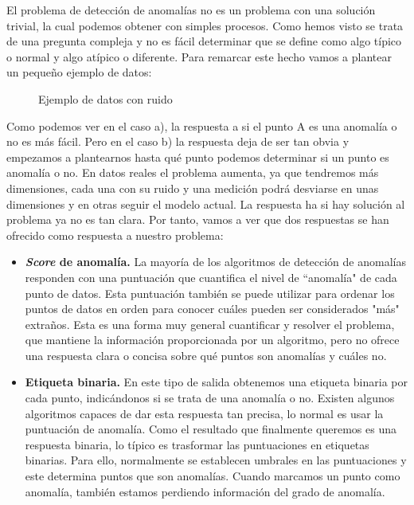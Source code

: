 El problema de detección de anomalías no es un problema con una solución trivial, la cual podemos obtener con simples procesos.
Como hemos visto se trata de una pregunta compleja y no es fácil determinar que se define como algo típico o normal y
algo atípico o diferente. Para remarcar este hecho vamos a plantear un pequeño ejemplo de datos:

\begin{figure}[h]
    \caption{\label{fig:my-label} Ejemplo de datos con ruido}
\end{figure}

Como podemos ver en el caso a), la respuesta a si el punto A es una anomalía o no es más fácil. Pero en el caso b) la respuesta
deja de ser tan obvia y empezamos a plantearnos hasta qué punto podemos determinar si un punto es anomalía o no. En datos reales
el problema aumenta, ya que tendremos más dimensiones, cada una con su ruido y una medición podrá desviarse en unas dimensiones y 
en otras seguir el modelo actual. La respuesta ha si hay solución al problema ya no es tan clara. Por tanto, vamos a ver que dos
respuestas se han ofrecido como respuesta a nuestro problema:

\begin{itemize}
    \item \textbf{\textit{Score} de anomalía.} La mayoría de los algoritmos de detección de anomalías responden con una puntuación que cuantifica
    el nivel de ``anomalía" de cada punto de datos. Esta puntuación también se puede utilizar para ordenar los puntos de datos en
    orden para conocer cuáles pueden ser considerados "más" extraños. Esta es una forma muy general cuantificar y resolver el problema,
    que mantiene la información proporcionada por un algoritmo, pero no ofrece una respuesta clara o concisa sobre qué puntos son
    anomalías y cuáles no.
    \item \textbf{Etiqueta binaria.} En este tipo de salida obtenemos una etiqueta binaria por cada punto, indicándonos si se trata de una
    anomalía o no. Existen algunos algoritmos capaces de dar esta respuesta tan precisa, lo normal es usar la puntuación de anomalía. Como
    el resultado que finalmente queremos es una respuesta binaria, lo típico es trasformar las puntuaciones en etiquetas binarias. Para ello,
    normalmente se establecen umbrales en las puntuaciones y este determina puntos que son anomalías. Cuando marcamos un punto como anomalía,
    también estamos perdiendo información del grado de anomalía.
\end{itemize}

